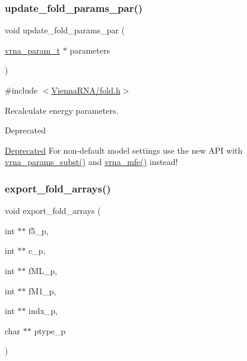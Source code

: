 \subsubsection{\texorpdfstring{update\+\_\+fold\+\_\+params\+\_\+par()}{update\_fold\_params\_par()}}
{\footnotesize\ttfamily void update\+\_\+fold\+\_\+params\+\_\+par (\begin{DoxyParamCaption}\item[{\hyperlink{group__energy__parameters_ga8a69ca7d787e4fd6079914f5343a1f35}{vrna\+\_\+param\+\_\+t} $\ast$}]{parameters }\end{DoxyParamCaption})}



{\ttfamily \#include $<$\hyperlink{fold_8h}{Vienna\+R\+N\+A/fold.\+h}$>$}



Recalculate energy parameters. 

\begin{DoxyRefDesc}{Deprecated}
\item[\hyperlink{deprecated__deprecated000075}{Deprecated}]For non-\/default model settings use the new A\+PI with \hyperlink{group__energy__parameters_ga5d1909208f7ea3baa98b75afaa1f62ca}{vrna\+\_\+params\+\_\+subst()} and \hyperlink{group__mfe__fold_gabd3b147371ccf25c577f88bbbaf159fd}{vrna\+\_\+mfe()} instead!\end{DoxyRefDesc}
\mbox{\label{group__mfe__fold__single_ga99641b8dbb40891da5490d3cc271e607}} 
\subsubsection{\texorpdfstring{export\+\_\+fold\+\_\+arrays()}{export\_fold\_arrays()}}
{\footnotesize\ttfamily void export\+\_\+fold\+\_\+arrays (\begin{DoxyParamCaption}\item[{int $\ast$$\ast$}]{f5\+\_\+p,  }\item[{int $\ast$$\ast$}]{c\+\_\+p,  }\item[{int $\ast$$\ast$}]{f\+M\+L\+\_\+p,  }\item[{int $\ast$$\ast$}]{f\+M1\+\_\+p,  }\item[{int $\ast$$\ast$}]{indx\+\_\+p,  }\item[{char $\ast$$\ast$}]{ptype\+\_\+p }\end{DoxyParamCaption})}



